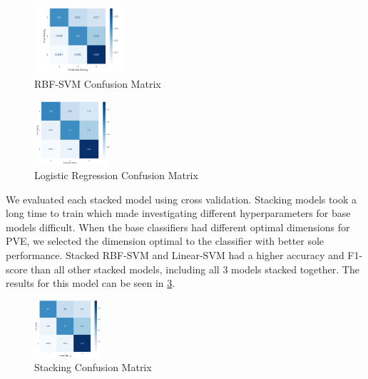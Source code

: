 \documentclass[11pt]{article}
\begin{document}
\begin{figure}
	\centering
	\includegraphics[width = 0.3\textwidth]{fig-rbf-cm.png}
	\caption{RBF-SVM Confusion Matrix}
	\label{fig:rbf-cm}
\end{figure}

\begin{figure}
	\centering
	\includegraphics[width = 0.25\textwidth]{fig-lr-cm.png}
	\caption{Logistic Regression Confusion Matrix}
	\label{fig:lr-cm}
\end{figure}


We evaluated each stacked model using cross validation. Stacking models took a long time to train which made investigating different hyperparameters for base models difficult. When the base classifiers had different optimal dimensions for PVE, we selected the dimension optimal to the classifier with better sole performance. Stacked RBF-SVM and Linear-SVM had a higher accuracy and F1-score than all other stacked models, including all 3 models stacked together. The results for this model can be seen in \ref{fig:stack-cm}.
\begin{figure}
	\centering
	\includegraphics[width = 0.22\textwidth]{fig-stack-cm.png}
	\caption{Stacking Confusion Matrix}
	\label{fig:stack-cm}
\end{figure}
\end{document}
